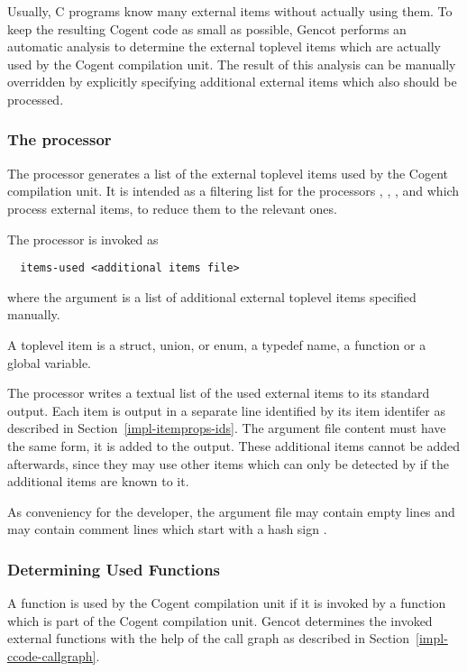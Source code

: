 Usually, C programs know many external items without actually using them. To keep the resulting Cogent code as small 
as possible, Gencot performs an automatic analysis to determine the external toplevel items which are actually used
by the Cogent compilation unit. The result of this analysis can be manually overridden by explicitly specifying additional
external items which also should be processed.

\subsubsection{The processor }

The processor  generates a list of the external toplevel items used by the Cogent compilation unit.
It is intended as a filtering list for the processors , , ,
 and  which process external items, to reduce them to the relevant ones.

The processor is invoked as
\begin{verbatim}
  items-used <additional items file>
\end{verbatim}
where the argument is a list of additional external toplevel items specified manually.

A toplevel item is a struct, union, or enum, a typedef name, a function or a global variable. 

The processor writes a textual list of the used external items to its standard output. Each item is output in a separate line 
identified by its item identifer as described in Section~\ref{impl-itemprops-ids}. The argument file content must have the 
same form, it is added to the output. These additional items cannot be added afterwards, since they may use other items
which can only be detected by  if the additional items are known to it.

As conveniency for the developer, the argument file may contain empty lines and may contain comment lines which
start with a hash sign \code{\#}.

\subsubsection{Determining Used Functions}

A function is used by the Cogent compilation unit if it is invoked by a function which is part of the Cogent compilation unit. 
Gencot determines the invoked external functions with the help of the call graph as described in 
Section~\ref{impl-ccode-callgraph}. 

